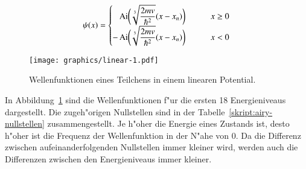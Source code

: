 \begin{loesung}
\begin{equation}
\psi(x)
=
\begin{cases}
\displaystyle
\phantom{-}\operatorname{Ai}\biggl( \root3\of{\frac{2mv}{\hbar^2}} (x-x_n)\biggr)
	&\qquad x\ge 0\\
\displaystyle
-\operatorname{Ai}\biggl( \root3\of{\frac{2mv}{\hbar^2}}(x-x_n)\biggr)
	&\qquad x < 0
\end{cases}
\end{equation}
\begin{figure}
\centering
\texttt{[image: graphics/linear-1.pdf]}
\caption{Wellenfunktionen eines Teilchens in einem linearen Potential.
\label{skript:linear-wave-functions}}
\end{figure}%
In Abbildung~\ref{skript:linear-wave-functions} sind die Wellenfunktionen
f"ur die ersten 18 Energieniveaus dargestellt.
Die zugeh"origen Nullstellen sind in der Tabelle~\ref{skript:airy-nullstellen}
zusammengestellt.
Je h"oher die Energie eines Zustands ist, desto h"oher ist die Frequenz
der Wellenfunktion in der N"ahe von $0$.
Da die Differenz zwischen aufeinanderfolgenden Nullstellen immer kleiner
wird, werden auch die Differenzen zwischen den Energieniveaus immer kleiner.
\end{loesung}

